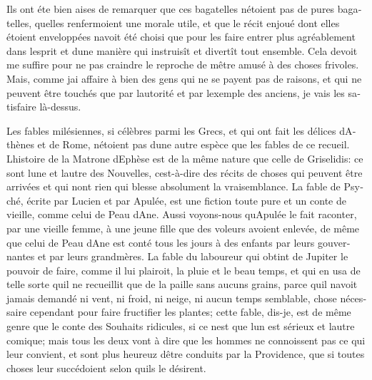 \documentclass[14pt,a4paper]{memoir}
\begin{document}
\begin{otherlanguage}{french}
Ils ont éte bien aises de remarquer que ces bagatelles
n\textquotesingle étoient pas de pures bagatelles,
qu\textquotesingle elles renfermoient une morale utile, et que le récit
enjoué dont elles étoient enveloppées n\textquotesingle avoit été choisi
que pour les faire entrer plus agréablement dans
l\textquotesingle esprit et d\textquotesingle une manière qui instruisît
et divertît tout ensemble. Cela devoit me suffire pour ne pas craindre
le reproche de m\textquotesingle être amusé à des choses frivoles. Mais,
comme j\textquotesingle ai affaire à bien des gens qui ne se payent pas
de raisons, et qui ne peuvent être touchés que par
l\textquotesingle autorité et par l\textquotesingle exemple des anciens,
je vais les satisfaire là-dessus.

Les fables milésiennes, si célèbres parmi les Grecs, et qui ont fait les
délices d\textquotesingle Athènes et de Rome, n\textquotesingle étoient
pas d\textquotesingle une autre espèce que les fables de ce recueil.
L\textquotesingle histoire de la Matrone d\textquotesingle Ephèse est de
la même nature que celle de Griselidis: ce sont l\textquotesingle une et
l\textquotesingle autre des Nouvelles, c\textquotesingle est-à-dire des
récits de choses qui peuvent être arrivées et qui n\textquotesingle ont
rien qui blesse absolument la vraisemblance. La fable de Psyché, écrite
par Lucien et par Apulée, est une fiction toute pure et un conte de
vieille, comme celui de Peau d\textquotesingle Ane. Aussi voyons-nous
qu\textquotesingle Apulée le fait raconter, par une vieille femme, à une
jeune fille que des voleurs avoient enlevée, de même que celui de Peau
d\textquotesingle Ane est conté tous les jours à des enfants par leurs
gouvernantes et par leurs grand\textquotesingle mères. La fable du
laboureur qui obtint de Jupiter le pouvoir de faire, comme il lui
plairoit, la pluie et le beau temps, et qui en usa de telle sorte
qu\textquotesingle il ne recueillit que de la paille sans aucuns grains,
parce qu\textquotesingle il n\textquotesingle avoit jamais demandé ni
vent, ni froid, ni neige, ni aucun temps semblable, chose nécessaire
cependant pour faire fructifier les plantes; cette fable, dis-je, est de
même genre que le conte des Souhaits ridicules, si ce
n\textquotesingle est que l\textquotesingle un est sérieux et
l\textquotesingle autre comique; mais tous les deux vont à dire que les
hommes ne connoissent pas ce qui leur convient, et sont plus heureuz
d\textquotesingle être conduits par la Providence, que si toutes choses
leur succédoient selon qu\textquotesingle ils le désirent.


\end{otherlanguage}
\end{document}
